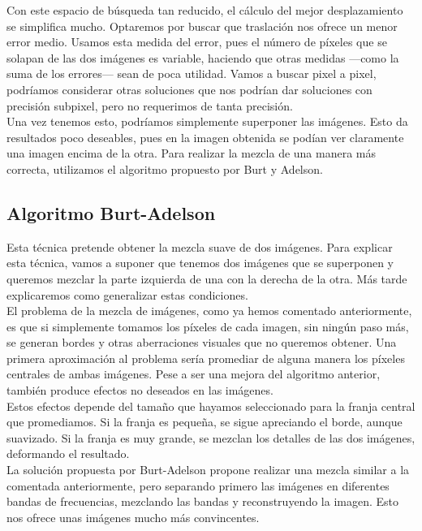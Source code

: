 \documentclass[10pt,a4paper]{article}
\theoremstyle{definition}
\begin{document}
Con este espacio de búsqueda tan reducido, el cálculo del mejor desplazamiento se simplifica mucho. Optaremos por buscar que traslación nos ofrece un menor error medio. Usamos esta medida del error, pues el número de píxeles que se solapan de las dos imágenes es variable, haciendo que otras medidas ---como la suma de los errores--- sean de poca utilidad. Vamos a buscar pixel a pixel, podríamos considerar otras soluciones que nos podrían dar soluciones con precisión subpixel, pero no requerimos de tanta precisión.\\

Una vez tenemos esto, podríamos simplemente superponer las imágenes. Esto da resultados poco deseables, pues en la imagen obtenida se podían ver claramente una imagen encima de la otra. Para realizar la mezcla de una manera más correcta, utilizamos el algoritmo propuesto por Burt y Adelson.\\

\subsection{Algoritmo Burt-Adelson}

Esta técnica pretende obtener la mezcla suave de dos imágenes. Para explicar esta técnica, vamos a suponer que tenemos dos imágenes que se superponen y queremos mezclar la parte izquierda de una con la derecha de la otra. Más tarde explicaremos como generalizar estas condiciones.\\

El problema de la mezcla de imágenes, como ya hemos comentado anteriormente, es que si simplemente tomamos los píxeles de cada imagen, sin ningún paso más, se generan bordes y otras aberraciones visuales que no queremos obtener. Una primera aproximación al problema sería promediar de alguna manera los píxeles centrales de ambas imágenes. Pese a ser una mejora del algoritmo anterior, también produce efectos no deseados en las imágenes.\\

Estos efectos depende del tamaño que hayamos seleccionado para la franja central que promediamos. Si la franja es pequeña, se sigue apreciando el borde, aunque suavizado. Si la franja es muy grande, se mezclan los detalles de las dos imágenes, deformando el resultado.\\

La solución propuesta por Burt-Adelson propone realizar una mezcla similar a la comentada anteriormente, pero separando primero las imágenes en diferentes bandas de frecuencias, mezclando las bandas y reconstruyendo la imagen. Esto nos ofrece unas imágenes mucho más convincentes.\\
\end{document}
